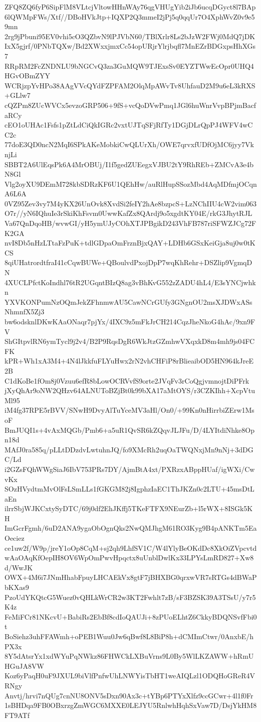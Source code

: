 ZFQ8ZQ6fyP6SipFlM8VLtcjVltowHHnWAy76qgVHUgYib2iJb6ucqDGyct8l7BAp
6lQWMpFWs/Xtf//DBoHVkJtp+IQXP2Q3mmeI2jPj5q0qqUr7O4XphWvZ0v9e59mn
2rg9jPbuni95EV0vhi5cO3QZbvN9lPJVbN60/TBlXrlr8Ls2bJzW2FWj0MdQ7jDK
IxX5gjrf/0PNbTQXw/Bd2XWxxjmxCc54opURjrYlrjbqfl7MnEZrBDGxpsHhXGs7
RRpRM2FcZNDNLU9bNGCvQ3za3GuMQW9TJExsSv0EYZTWwEcOpr0UHQ4HGvOBmZYY
WCRjzpYvHPo38AAgVVcQYdFZPFAM2OlqMpAWvTv8UhfauD2M9u6eL3kRXS+GLlw7
cQZPm8ZUcWVCx5evzoGRP506+9fS+vcQoDVwPmq1JGl6huWnrVvpBPjmBacfaRCy
cEO1oUHAc1Fsfs1pZtLdCiQkIGRc2vxtUJTqSFjRfTy1DGjDLrQpPJ4WFV4wCC2c
77doE3QD0ncN2MqI6SPkAKeMobkiCwQLUrXh/OWE7qrvxfUDfOjMC6jyy7VknjLi
SBBT2A6UlEqsPk6A4MrOBUj/I1f5gedZUEegxVJBU2tY9RhREb+ZMCvA3e4bN8Gl
Vlg2oyXU9DEmM728kbSDRzKF6U1QEhHw/auRlHupSSozMbd4AqMDfmjOCqnA6L6A
0VZ95Zev3vy7M4yKX26UnOvk8XvdSi2feIY2hAe8bzpcS+LzNChIIU4cW2vim063
O7r//yN6IQhuIe3rSkiKhFsvm0UwwKafZx8QArdj9o5xgdtKY04E/rkG3JhytRJL
Va67QnDqoHB/wvwGI/yH5ymUJyCOhXTJPBgikD243VhFB787riSFWZJCg72FK2GA
nvI8Db5nHzLTtaFzPuK+tdlGDpaOmFrznBjxQAY+LDHb6GSxKeiGja8uj0w0tKCS
8qiUHatrordtfraI41cCqwBUWe+QBoulvdPxojDpP7wqKhRehr+DSZlip9VgmqDN
4XUCLPfctKoIndhl76tR2UGqntBIzQ8ag3vBhKvG552zZADU4hL4/E3sYNCjwhkn
YXVKONPumNzOQmJekZFhnmwAU5CawNCrGUfy3GNgnOU2msXJDWxASsNhmnfX5Zj3
bw6odsknlDKwKAaONaqr7pjYx/4IXC9z5mFkJrCH214CqzJheNkoG4hAc/9xn9FV
ShGItpvlRN6ymTycl9j2v4/B2P9RqsDgR6WkJtzGZmhwVXqxkD8m4mh9js04FCFK
kPR+Wh1xA3M4+4N4lJkkfuFLYuHwx2rN2vhCHFiP8rBlieaibOD5HN964kJreE2B
C1dKoBe1fOm8j0Vzuu6efR8bLowOCRVvfS9orte2JVqFv3rCoQgjvmnojtDiPFrk
jXyQhAr9oNW2QHzv64ALNUToBZjBt0k99bXA17aMtOYS/r3CZKIhh+XcpVtuMl95
iM4fg37RPE5rBVV/SNwH9DvyAlTuYceMV3aHl/On0/+99Kn0nHirrbiZErw1MsoF
BmJUQI1s+4vAxMQGb/Pmb6+a5uR1QvSR6kZQqvJLJFu/D/4LYItdiNhke8Opn18d
MAfJ0ra585q/pLLtDDzdvLwtuhnJQ/fo9XMcRh2uqOaTWQNxjMn9nNj+3dDGC/Ld
i2GZsFQhWWgSiaJ6IbV753PRs7DY/AjmBtA4xt/PXRzxABppHUaf/igWXi/CwvKx
SOzHVydtmMvOlFsLSmLLs1fGKGM82j8IgphzIaEC1ThJKZn0c2LTU+45msDtLaEn
ilrrSbjWJKCxtySyDTC/69j0df2EhJKffj5TKeFTFX9NEurZb+l5rWX+8ISGk5KH
ImGcrFgmh/6uD2ANA9ygaObOgnQks2NwQMJhgM61RO3Kyg9B4pANKTm5EaOeciez
ce1uw2f/W9p/jreY1oOp8CqM+sj2qh9LhfSV1C/W4lYlyBeOKdDc8XkOiZVpcvtd
wAaOAqKfOepIH8OV6WpOmPwvHpqctx8uUnblDwlKx33LPYsLmRD827+Xw8d/WwJK
OWX+4M6i7JNmHhabFpuyLHCAEkVx8gtF7jBHXBG0qrxwVR7sRTGs4dBWaPbKXas9
PzoUdYKQtcG5Wuez0vQHLkWrCR2w3KT2Fwhlt7zB/sF3BZSK39A3TSsU/y7r5K4z
FeMiFCr81NKcvU+BabiRs2EbBf8cdIoQAUJi+8zPUoELhtZ6CkkyBDQNSvfFbi0t
BoSiehz3uhFFAWmh+oPEB1Wuu0Jw6qBwf8L8BiP8h+dCMImCtwr/0AnxbE/hPX3x
8Y5dAtsrYx1xdWYuPqNWkz86FHWCkLXBuVrns9L0By5WlLKZAWW+hRmUHGuJA8VW
Koz6yPaqH0uF9JXUL9biVlfPnfwUhLNWYisTbHT1weAIQLzl1ODQHoGReR4VRNgy
Anvtj/hrvi7nQUg7cnNU8ONV5sDxn90Ax3c+tYBp6PTYxXlfz9ccGCwr+4l1f0Fr
1sBHDqa9FB0OBxrzgZmWGC6MXXE0LEJYU5RnlwhHqhSxVaw7D/DsjYkHM8FT9ATf
